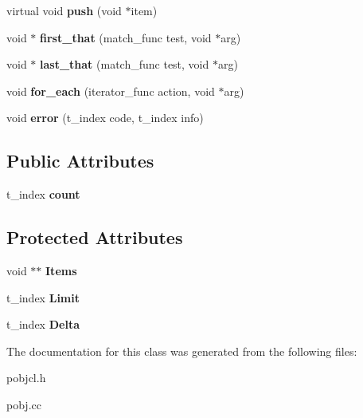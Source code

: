 \begin{DoxyCompactItemize}
\item 
\hypertarget{classcl__list_ad23d1c54162dd0249295290a7eded4fc}{
virtual void {\bfseries push} (void $\ast$item)}
\label{classcl__list_ad23d1c54162dd0249295290a7eded4fc}

\item 
\hypertarget{classcl__list_a48be20e7bb978fb86af3b15d332a0779}{
void $\ast$ {\bfseries first\_\-that} (match\_\-func test, void $\ast$arg)}
\label{classcl__list_a48be20e7bb978fb86af3b15d332a0779}

\item 
\hypertarget{classcl__list_afd2e651e8ee471d31c0ca5466cf17caa}{
void $\ast$ {\bfseries last\_\-that} (match\_\-func test, void $\ast$arg)}
\label{classcl__list_afd2e651e8ee471d31c0ca5466cf17caa}

\item 
\hypertarget{classcl__list_ac4d0073073329fac159aa6908450984a}{
void {\bfseries for\_\-each} (iterator\_\-func action, void $\ast$arg)}
\label{classcl__list_ac4d0073073329fac159aa6908450984a}

\item 
\hypertarget{classcl__list_acf5777e046c1c0f1ea433e4998422f46}{
void {\bfseries error} (t\_\-index code, t\_\-index info)}
\label{classcl__list_acf5777e046c1c0f1ea433e4998422f46}

\end{DoxyCompactItemize}
\subsection*{Public Attributes}
\begin{DoxyCompactItemize}
\item 
\hypertarget{classcl__list_af6b118ba286729469cface6d412a53c3}{
t\_\-index {\bfseries count}}
\label{classcl__list_af6b118ba286729469cface6d412a53c3}

\end{DoxyCompactItemize}
\subsection*{Protected Attributes}
\begin{DoxyCompactItemize}
\item 
\hypertarget{classcl__list_a793ad4228dd48d1ea1dd6b08319b5870}{
void $\ast$$\ast$ {\bfseries Items}}
\label{classcl__list_a793ad4228dd48d1ea1dd6b08319b5870}

\item 
\hypertarget{classcl__list_a40bcb89ac023574fd389cb30664b664b}{
t\_\-index {\bfseries Limit}}
\label{classcl__list_a40bcb89ac023574fd389cb30664b664b}

\item 
\hypertarget{classcl__list_ab896ba4e70d00406bcdbcbea0d5f1c05}{
t\_\-index {\bfseries Delta}}
\label{classcl__list_ab896ba4e70d00406bcdbcbea0d5f1c05}

\end{DoxyCompactItemize}


The documentation for this class was generated from the following files:\begin{DoxyCompactItemize}
\item 
pobjcl.h\item 
pobj.cc\end{DoxyCompactItemize}
